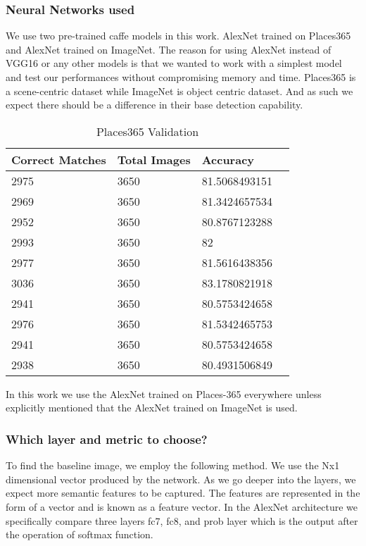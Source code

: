 \documentclass{article}
\begin{document}
\subsubsection{Neural Networks used}
We use two pre-trained caffe \cite{jia2014caffe} models in this work. AlexNet\cite{NIPS2012_4824} trained on Places365\cite{zhou2017places} and AlexNet trained on ImageNet. The reason for using AlexNet instead of VGG16 or any other models is that we wanted to work with a simplest model and test our performances without compromising memory and time. Places365 is a scene-centric dataset while ImageNet is object centric dataset. And as such we expect there should be a difference in their base detection capability.
\begin{table}[]
\centering
\caption{Places365 Validation}
\label{p365_val}
\begin{tabular}{|l|l|ll|}
  \hline
  Correct Matches & Total Images & Accuracy  &\\
  \hline
  2975 & 3650 & 81.5068493151 &  \\
  2969 & 3650 & 81.3424657534 &  \\
  2952 & 3650 & 80.8767123288 &  \\
  2993 & 3650 & 82            &  \\
  2977 & 3650 & 81.5616438356 &  \\
  3036 & 3650 & 83.1780821918 &  \\
  2941 & 3650 & 80.5753424658 &  \\
  2976 & 3650 & 81.5342465753 &  \\
  2941 & 3650 & 80.5753424658 &  \\
  2938 & 3650 & 80.4931506849 & \\
  \hline
\end{tabular}
\end{table}

In this work we use the AlexNet trained on Places-365 everywhere unless explicitly mentioned that the AlexNet trained on ImageNet is used.

\subsubsection{Which layer and metric to choose?}
To find the baseline image, we employ the following method. We use the Nx1 dimensional vector produced by the network. As we go deeper into the layers, we expect more semantic features to be captured. The features are represented in the form of a vector and is known as a feature vector. In the AlexNet architecture we specifically compare three layers fc7, fc8, and prob layer which is the output after the operation of softmax function.
\end{document}
